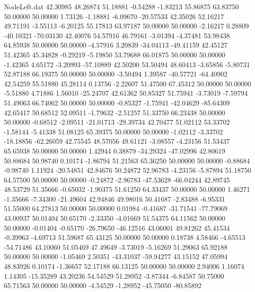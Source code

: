 \begin{filecontents}{NodeLeft.dat}
  42.30985   48.26874   51.18881    -0.54288   -1.83213   55.86875   63.83750   50.00000   50.00000    1.73126   -1.18881   -6.09670  -20.57533
  42.35026   52.16217   49.71191    -3.55113   -6.20125   55.17813   63.97187   50.00000   50.00000   -2.16217    0.28809  -40.10321  -70.03130
  42.40076   54.57916   46.79161    -3.01394   -4.37481   53.98438   64.85938   50.00000   50.00000   -4.57916    3.20839  -34.04113  -49.41159
  42.45127   51.42365   45.34828    -0.29219   -5.19850   53.79688   66.01875   50.00000   50.00000   -1.42365    4.65172   -3.20993  -57.10889
  42.50200   53.50494   48.60413    -3.65856   -5.80731   52.87188   66.19375   50.00000   50.00000   -3.50494    1.39587  -40.57721  -64.40902
  42.54259   55.51880   45.28114     0.13756   -2.22607   51.47500   67.45312   50.00000   50.00000   -5.51880    4.71886    1.56010  -25.24707
  42.61362   50.85327   51.75941    -3.73019   -7.59794   51.49063   66.74062   50.00000   50.00000   -0.85327   -1.75941  -42.04629  -85.64309
  42.65417   50.68512   52.09511    -1.79632   -2.51257   51.33750   66.23438   50.00000   50.00000   -0.68512   -2.09511  -21.01713  -29.39734
  42.70477   51.02112   53.33702    -1.58144   -5.41338   51.08125   65.39375   50.00000   50.00000   -1.02112   -3.33702  -18.18856  -62.26059
  42.75545   48.57056   49.61121    -3.08557   -4.23156   51.53437   65.65938   50.00000   50.00000    1.42944    0.38879  -34.29324  -47.02996
  42.80619   50.88684   50.98740     0.10174   -1.86794   51.21563   65.36250   50.00000   50.00000   -0.88684   -0.98740    1.11924  -20.54851
  42.84676   50.24872   52.96783    -4.23156   -5.87894   51.18750   64.57500   50.00000   50.00000   -0.24872   -2.96783  -47.53628  -66.04244
  42.89745   48.53729   51.35666    -0.65032   -1.90375   51.61250   64.33437   50.00000   50.00000    1.46271   -1.35666   -7.34300  -21.49604
  42.94846   49.98016   50.41687    -2.83488   -6.95331   51.55000   64.27813   50.00000   50.00000    0.01984   -0.41687  -31.71541  -77.79069
  43.00937   50.01404   50.65170    -2.33350   -4.01669   51.54375   64.11562   50.00000   50.00000   -0.01404   -0.65170  -26.79650  -46.12516
  43.06001   49.81262   45.41534    -0.39963   -4.69713   51.59687   65.43125   50.00000   50.00000    0.18738    4.58466   -4.65513  -54.71486
  43.10060   51.05469   47.49649    -3.73019   -5.16269   51.29063   65.92188   50.00000   50.00000   -1.05469    2.50351  -43.31037  -59.94277
  43.15152   47.05994   48.83926     0.10174   -1.36657   52.17188   66.13125   50.00000   50.00000    2.94006    1.16074    1.14305  -15.35289
  43.20236   54.54529   51.28952    -3.87344   -6.84587   50.75000   65.71563   50.00000   50.00000   -4.54529   -1.28952  -45.75050  -80.85892

\end{filecontents}
